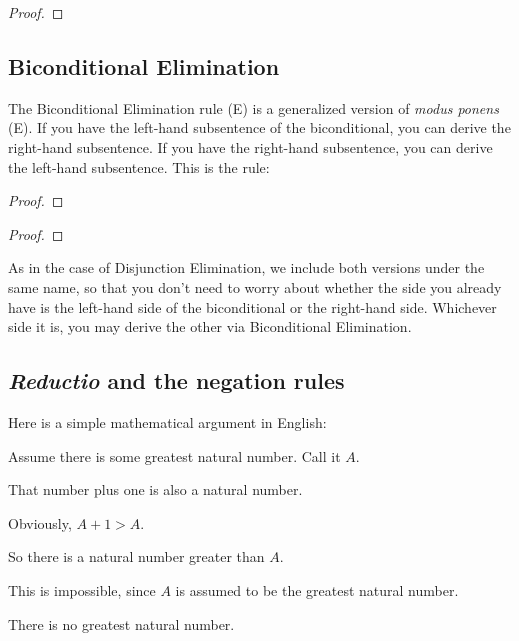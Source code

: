 \begin{proof}
	 
\end{proof}


\subsection{Biconditional Elimination}

The Biconditional Elimination rule ({\eiff}E) is a generalized version of \emph{modus ponens} ({\eif}E). If you have the left-hand subsentence of the biconditional, you can derive the right-hand subsentence. If you have the right-hand subsentence, you can derive the left-hand subsentence. This is the rule:



\begin{multicols}{2}
\begin{proof}
	\metaA{}
	\metaB{} 
\end{proof}
\begin{proof}
	\metaB{}
	\metaA{} 
\end{proof}
\end{multicols}

As in the case of Disjunction Elimination, we include both versions under the same name, so that you don't need to worry about whether the side you already have is the left-hand side of the biconditional or the right-hand side. Whichever side it is, you may derive the other via Biconditional Elimination.


\subsection{\emph{Reductio} and the negation rules}
Here is a simple mathematical argument in English:
\begin{earg}
\item[] Assume there is some greatest natural number. Call it $A$.
\item[] That number plus one is also a natural number.
\item[] Obviously, $A+1 > A$.
\item[] So there is a natural number greater than $A$.
\item[] This is impossible, since $A$ is assumed to be the greatest natural number.
\item[\therefore] There is no greatest natural number.
\end{earg}

